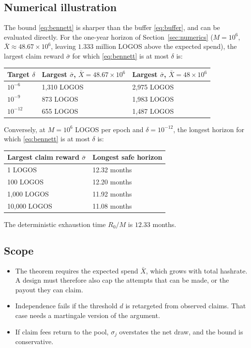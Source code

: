 \documentclass[11pt,a4paper]{article}
\begin{document}
\subsection{Numerical illustration}
The bound \eqref{eq:bennett} is sharper than the buffer \eqref{eq:buffer}, and can be evaluated directly. For the one-year horizon of Section~\ref{sec:numerics} ($M=10^6$, $\bar X\approx48.67\times10^6$, leaving $1.333$ million LOGOS above the expected spend), the largest claim reward $\bar\sigma$ for which \eqref{eq:bennett} is at most $\delta$ is:
\begin{center}
\small
\begin{tabularx}{\linewidth}{@{}YYY@{}}
\toprule
Target $\delta$ & Largest $\bar\sigma$, $\bar X=48.67\times10^6$ & Largest $\bar\sigma$, $\bar X=48\times10^6$\\
\midrule
$10^{-6}$ & 1,310 LOGOS & 2,975 LOGOS\\
$10^{-9}$ & 873 LOGOS & 1,983 LOGOS\\
$10^{-12}$ & 655 LOGOS & 1,487 LOGOS\\
\bottomrule
\end{tabularx}
\end{center}
Conversely, at $M=10^6$ LOGOS per epoch and $\delta=10^{-12}$, the longest horizon for which \eqref{eq:bennett} is at most $\delta$ is:
\begin{center}
\small
\begin{tabularx}{\linewidth}{@{}YY@{}}
\toprule
Largest claim reward $\bar\sigma$ & Longest safe horizon\\
 LOGOS & 12.32 months\\
100 LOGOS & 12.20 months\\
1,000 LOGOS & 11.92 months\\
10,000 LOGOS & 11.08 months\\
\bottomrule
\end{tabularx}
\end{center}
The deterministic exhaustion time $R_0/M$ is $12.33$ months.

\subsection{Scope}
\begin{itemize}
\item The theorem requires the expected spend $\bar X$, which grows with total hashrate. A design must therefore also cap the attempts that can be made, or the payout they can claim.
\item Independence fails if the threshold $d$ is retargeted from observed claims. That case needs a martingale version of the argument.
\item If claim fees return to the pool, $\sigma_j$ overstates the net draw, and the bound is conservative.
\end{itemize}
\end{document}
